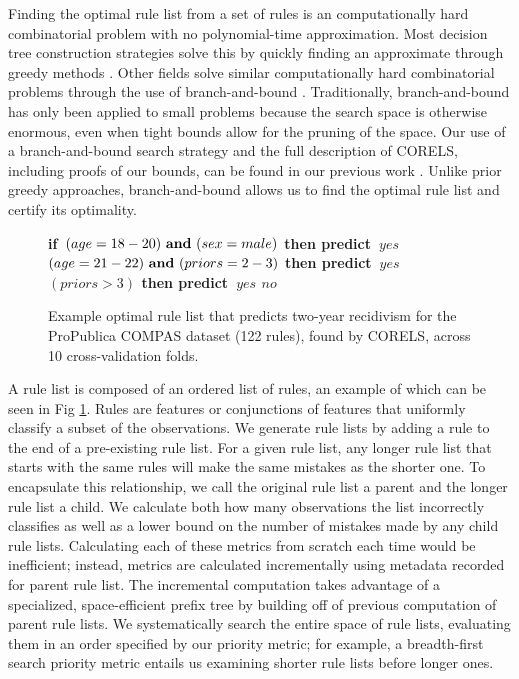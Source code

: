 \documentclass[format=sigconf]{acmart}
\def\bif{\bf if~}
\def\belif{{\bf else if~}}
\def\bthen{{\bf then predict~}}
\def\belse{{\bf else predict~}}
\def\band{{\bf ~and~}}
\begin{document}
Finding the optimal rule list from a set of rules is an computationally hard combinatorial problem with no polynomial-time approximation.
Most decision tree construction strategies solve this by quickly finding an approximate through greedy  methods \citep{BreimanFrOlSt84, Quinlan93}.
Other fields solve similar computationally hard combinatorial problems through the use of branch-and-bound \citep{Clausen99}.
Traditionally, branch-and-bound has only been applied to small problems because the search space is otherwise enormous, even when tight bounds allow for the pruning of the space.
Our use of a branch-and-bound search strategy and the full description of CORELS, including proofs of our bounds, can be found in our previous work \cite{AngelinoLaAlSeRu17, ErtekinRu17}.
Unlike prior greedy approaches, branch-and-bound allows us to find the optimal rule list and certify its optimality.

\begin{figure}[b!]
\vspace{-1mm}
\begin{algorithmic}
\State \bif $(age = 18-20) \band (sex = male)$ \bthen $yes$
\State \belif $(age = 21-22) \band (priors = 2-3)$ \bthen $yes$
\State \belif $(priors > 3)$ \bthen $yes$
\State \belse $no$
\end{algorithmic}
\vspace{-2mm}
\caption{Example optimal rule list that predicts two-year recidivism for the ProPublica COMPAS dataset (122 rules), found by CORELS, across 10 cross-validation folds.
%
}
\label{fig:recidivism}
\end{figure}

A rule list is composed of an ordered list of rules, an example of which can be seen in Fig \ref{fig:recidivism}.
Rules are features or conjunctions of features that uniformly classify a subset of the observations.
We generate rule lists by adding a rule to the end of a pre-existing rule list.
For a given rule list, any longer rule list that starts with the same rules will make the same mistakes as the shorter one.
To encapsulate this relationship, we call the original rule list a parent and the longer rule list a child.
We calculate both how many observations the list incorrectly classifies as well as a lower bound on the number of mistakes made by any child rule lists.
Calculating each of these metrics from scratch each time would be inefficient; instead, metrics are calculated incrementally using metadata recorded for parent rule list.
The incremental computation takes advantage of a specialized, space-efficient prefix tree by building off of previous computation of parent rule lists.
We systematically search the entire space of rule lists, evaluating them in an order specified by our priority metric; for example, a breadth-first search priority metric entails us examining shorter rule lists before longer ones.
\end{document}
